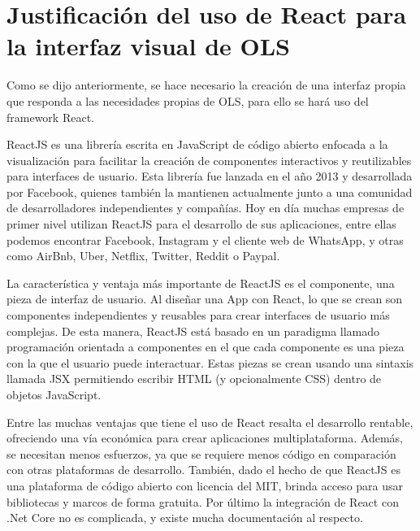 \section{Justificaci\'on del uso de React para la interfaz visual de OLS}
Como se dijo anteriormente, se hace necesario la creaci\'on de una interfaz propia que responda a las necesidades propias de OLS, para ello se har\'a uso del framework React.

ReactJS es una librer\'ia escrita en JavaScript de c\'odigo abierto enfocada a la visualizaci\'on para facilitar la creaci\'on de componentes interactivos y reutilizables para interfaces de usuario. Esta librer\'ia fue lanzada en el a\~no 2013 y desarrollada por Facebook, quienes tambi\'en la mantienen actualmente junto a una comunidad de desarrolladores independientes y compa\~n\'ias. Hoy en d\'ia muchas empresas de primer nivel utilizan ReactJS para el desarrollo de sus aplicaciones, entre ellas podemos encontrar Facebook, Instagram y el cliente web de WhatsApp, y otras como AirBnb, Uber, Netflix, Twitter, Reddit o Paypal.

La caracter\'istica y ventaja m\'as importante de ReactJS es el componente, una pieza de interfaz de usuario. Al dise\~nar una App con React, lo que se crean son componentes independientes y reusables para crear interfaces de usuario m\'as complejas. De esta manera, ReactJS est\'a basado en un paradigma llamado programaci\'on orientada a componentes en el que cada componente es una pieza con la que el usuario puede interactuar. Estas piezas se crean usando una sintaxis llamada JSX permitiendo escribir HTML (y opcionalmente CSS) dentro de objetos JavaScript.

Entre las muchas ventajas que tiene el uso de React resalta el desarrollo rentable, ofreciendo una v\'ia econ\'omica para crear aplicaciones multiplataforma. Adem\'as, se necesitan menos esfuerzos, ya que se requiere menos c\'odigo en comparaci\'on con otras plataformas de desarrollo. Tambi\'en, dado el hecho de que ReactJS es una plataforma de c\'odigo abierto con licencia del MIT, brinda acceso para usar bibliotecas y marcos de forma gratuita. Por \'ultimo la integraci\'on de React con .Net Core no es complicada, y existe mucha documentaci\'on al respecto.


